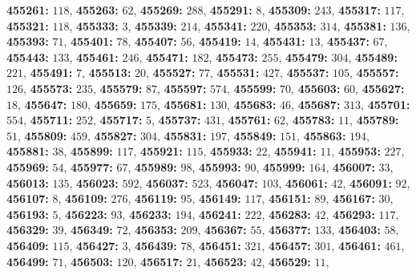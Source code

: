 \textsf{\bfseries 455261:} $118$, \textsf{\bfseries 455263:} $62$, \textsf{\bfseries 455269:} $288$, \textsf{\bfseries 455291:} $8$, \textsf{\bfseries 455309:} $243$, \textsf{\bfseries 455317:} $117$, \textsf{\bfseries 455321:} $118$, \textsf{\bfseries 455333:} $3$, \textsf{\bfseries 455339:} $214$, \textsf{\bfseries 455341:} $220$, \textsf{\bfseries 455353:} $314$, \textsf{\bfseries 455381:} $136$, \textsf{\bfseries 455393:} $71$, \textsf{\bfseries 455401:} $78$, \textsf{\bfseries 455407:} $56$, \textsf{\bfseries 455419:} $14$, \textsf{\bfseries 455431:} $13$, \textsf{\bfseries 455437:} $67$, \textsf{\bfseries 455443:} $133$, \textsf{\bfseries 455461:} $246$, \textsf{\bfseries 455471:} $182$, \textsf{\bfseries 455473:} $255$, \textsf{\bfseries 455479:} $304$, \textsf{\bfseries 455489:} $221$, \textsf{\bfseries 455491:} $7$, \textsf{\bfseries 455513:} $20$, \textsf{\bfseries 455527:} $77$, \textsf{\bfseries 455531:} $427$, \textsf{\bfseries 455537:} $105$, \textsf{\bfseries 455557:} $126$, \textsf{\bfseries 455573:} $235$, \textsf{\bfseries 455579:} $87$, \textsf{\bfseries 455597:} $574$, \textsf{\bfseries 455599:} $70$, \textsf{\bfseries 455603:} $60$, \textsf{\bfseries 455627:} $18$, \textsf{\bfseries 455647:} $180$, \textsf{\bfseries 455659:} $175$, \textsf{\bfseries 455681:} $130$, \textsf{\bfseries 455683:} $46$, \textsf{\bfseries 455687:} $313$, \textsf{\bfseries 455701:} $554$, \textsf{\bfseries 455711:} $252$, \textsf{\bfseries 455717:} $5$, \textsf{\bfseries 455737:} $431$, \textsf{\bfseries 455761:} $62$, \textsf{\bfseries 455783:} $11$, \textsf{\bfseries 455789:} $51$, \textsf{\bfseries 455809:} $459$, \textsf{\bfseries 455827:} $304$, \textsf{\bfseries 455831:} $197$, \textsf{\bfseries 455849:} $151$, \textsf{\bfseries 455863:} $194$, \textsf{\bfseries 455881:} $38$, \textsf{\bfseries 455899:} $117$, \textsf{\bfseries 455921:} $115$, \textsf{\bfseries 455933:} $22$, \textsf{\bfseries 455941:} $11$, \textsf{\bfseries 455953:} $227$, \textsf{\bfseries 455969:} $54$, \textsf{\bfseries 455977:} $67$, \textsf{\bfseries 455989:} $98$, \textsf{\bfseries 455993:} $90$, \textsf{\bfseries 455999:} $164$, \textsf{\bfseries 456007:} $33$, \textsf{\bfseries 456013:} $135$, \textsf{\bfseries 456023:} $592$, \textsf{\bfseries 456037:} $523$, \textsf{\bfseries 456047:} $103$, \textsf{\bfseries 456061:} $42$, \textsf{\bfseries 456091:} $92$, \textsf{\bfseries 456107:} $8$, \textsf{\bfseries 456109:} $276$, \textsf{\bfseries 456119:} $95$, \textsf{\bfseries 456149:} $117$, \textsf{\bfseries 456151:} $89$, \textsf{\bfseries 456167:} $30$, \textsf{\bfseries 456193:} $5$, \textsf{\bfseries 456223:} $93$, \textsf{\bfseries 456233:} $194$, \textsf{\bfseries 456241:} $222$, \textsf{\bfseries 456283:} $42$, \textsf{\bfseries 456293:} $117$, \textsf{\bfseries 456329:} $39$, \textsf{\bfseries 456349:} $72$, \textsf{\bfseries 456353:} $209$, \textsf{\bfseries 456367:} $55$, \textsf{\bfseries 456377:} $133$, \textsf{\bfseries 456403:} $58$, \textsf{\bfseries 456409:} $115$, \textsf{\bfseries 456427:} $3$, \textsf{\bfseries 456439:} $78$, \textsf{\bfseries 456451:} $321$, \textsf{\bfseries 456457:} $301$, \textsf{\bfseries 456461:} $461$, \textsf{\bfseries 456499:} $71$, \textsf{\bfseries 456503:} $120$, \textsf{\bfseries 456517:} $21$, \textsf{\bfseries 456523:} $42$, \textsf{\bfseries 456529:} $11$, 
